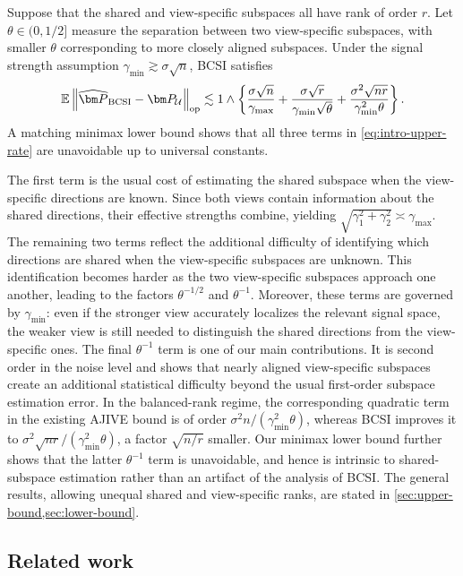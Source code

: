 \documentclass[11pt]{article}
\newcommand{\opn}[1]{\left\lVert #1\right\rVert_{\mathrm{op}}}
\newcommand{\cU}{\mathcal{U}}
\newcommand{\gmin}{\gamma_{\min}}
\newcommand{\gmax}{\gamma_{\max}}
\begin{document}
Suppose that the shared and view-specific subspaces all have rank of order $r$.  Let
$\theta\in(0,1/2]$ measure the separation between two view-specific subspaces,
with smaller $\theta$ corresponding to more closely aligned subspaces. 
Under the signal strength assumption
$\gmin \gtrsim\sigma\sqrt n$, BCSI satisfies
\begin{equation}
\label{eq:intro-upper-rate}
  \mathbb E
  \opn{
    \widehat{\bm P}_{\rm BCSI}-\bm P_{\cU}
  }
  \lesssim
  1\wedge
  \left\{
    \frac{\sigma\sqrt n}{\gmax}
    +
    \frac{\sigma\sqrt r}
         {\gmin \sqrt\theta}
    +
    \frac{\sigma^2\sqrt{nr}}
         {\gmin ^2\theta}
  \right\}.
\end{equation}
A matching minimax lower bound shows that all three terms in
\cref{eq:intro-upper-rate} are unavoidable up to universal constants.


The first term is the usual cost of estimating the shared subspace when the view-specific directions are known. Since both views contain information about the shared directions, their effective strengths combine, yielding $\sqrt{\gamma_1^2+\gamma_2^2}\asymp\gmax$. The remaining two terms reflect the additional difficulty of identifying which directions are shared when the view-specific subspaces are unknown. This identification becomes harder as the two view-specific subspaces approach one another, leading to the factors $\theta^{-1/2}$ and $\theta^{-1}$. Moreover, these terms are governed by $\gmin$: even if the stronger view accurately localizes the relevant signal space, the weaker view is still needed to distinguish the shared directions from the view-specific ones. The final $\theta^{-1}$ term is one of our main contributions. It is second
order in the noise level and shows that nearly aligned view-specific subspaces
create an additional statistical difficulty beyond the usual first-order
subspace estimation error. In the balanced-rank regime, the corresponding
quadratic term in the existing AJIVE bound is of order
$\sigma^2 n/(\gmin^2\theta)$, whereas BCSI improves it to
$\sigma^2\sqrt{nr}/(\gmin^2\theta)$, a factor $\sqrt{n/r}$ smaller.
Our minimax lower bound further shows that the latter $\theta^{-1}$ term is
unavoidable, and hence is intrinsic to shared-subspace estimation rather than
an artifact of the analysis of BCSI. The general results, allowing unequal
shared and view-specific ranks, are stated in
\cref{sec:upper-bound,sec:lower-bound}.


\subsection{Related work}
\end{document}

